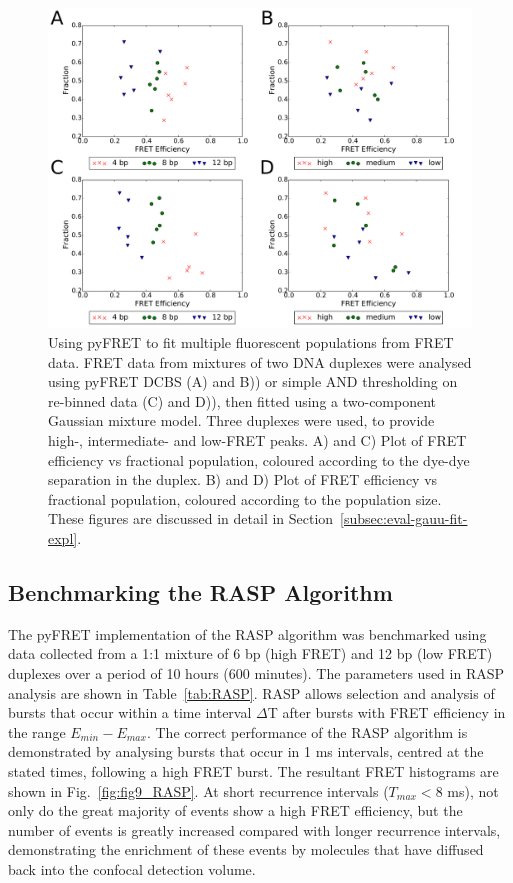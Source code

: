 \begin{figure}[!ht]
   \begin{center}
      \includegraphics*[clip=true, width=6in]{pyFRET/ratios_FRET.pdf}
      \caption{Using pyFRET to fit multiple fluorescent populations from FRET data. FRET data from mixtures of two DNA duplexes were analysed using pyFRET DCBS (A) and B)) or simple AND thresholding on re-binned data (C) and D)), then fitted using a two-component Gaussian mixture model. Three duplexes were used, to provide high-, intermediate- and low-FRET peaks. A) and C) Plot of FRET efficiency vs fractional population, coloured according to the dye-dye separation in the duplex. B) and D) Plot of FRET efficiency vs fractional population, coloured according to the population size. These figures are discussed in detail in Section~\ref{subsec:eval-gauu-fit-expl}.}
      \label{fig:ratios_FRET}
   \end{center}
\end{figure}

\clearpage

\subsection{Benchmarking the RASP Algorithm}    
The pyFRET implementation of the RASP algorithm was benchmarked using data collected from a 1:1 mixture of 6 bp (high FRET) and 12 bp (low FRET) duplexes over a period of 10 hours (600 minutes). The parameters used in RASP analysis are shown in Table~\ref{tab:RASP}. RASP allows selection and analysis of bursts that occur within a time interval $\Delta$T after bursts with FRET efficiency in the range $E_{min} - E_{max}$. The correct performance of the RASP algorithm is demonstrated by analysing bursts that occur in 1 ms intervals, centred at the stated times, following a high FRET burst. The resultant FRET histograms are shown in Fig.~\ref{fig:fig9_RASP}. At short recurrence intervals ($T_{max} < 8$ ms), not only do the great majority of events show a high FRET efficiency, but the number of events is greatly increased compared with longer recurrence intervals, demonstrating the enrichment of these events by molecules that have diffused back into the confocal detection volume. 


